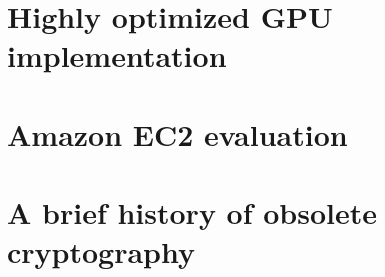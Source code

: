 

\ifext
\section{Highly optimized GPU implementation}

\fi

\ifext
\section{Amazon EC2 evaluation}

\fi

\ifext
\section{A brief history of obsolete cryptography}

\fi
